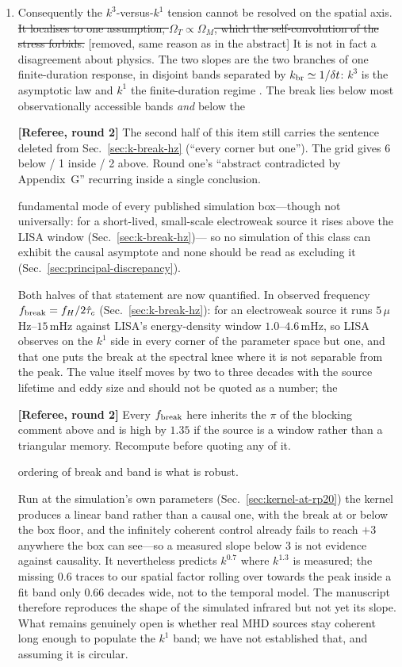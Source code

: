\documentclass[10pt,prd,aps,nobibnotes,superscriptaddress,preprintnumbers,notitlepage]{revtex4-1}
\newcommand{\rev}[1]{\par\noindent\begin{tcolorbox}[colback=blue!4,colframe=blue!55,
    boxrule=0.5pt,left=3pt,right=3pt,top=2pt,bottom=2pt,breakable]
    \footnotesize\textcolor{blue!65!black}{\textbf{[Referee, round 2]} #1}\end{tcolorbox}\par}
\newcommand{\revX}[1]{\par\noindent\begin{tcolorbox}[colback=red!5,colframe=red!70!black,
    boxrule=1pt,left=3pt,right=3pt,top=2pt,bottom=2pt,breakable]
    \footnotesize\textcolor{red!70!black}{\textbf{[Referee, round 2 --- BLOCKING]} #1}\end{tcolorbox}\par}
\newcommand{\rev}[1]{}\newcommand{\revX}[1]{}
\newcommand{\add}[1]{{\color{red}#1}}
\newcommand{\del}[1]{{\color{red}\sout{#1}}}
\newcommand{\why}[1]{{\color{red}\footnotesize\textsf{[#1]}}}
\newcommand{\add}[1]{#1}
\newcommand{\del}[1]{}
\newcommand{\why}[1]{}
\begin{document}
\begin{enumerate}
  \item Consequently the $k^{3}$-versus-$k^{1}$ tension cannot be resolved on the
  spatial axis.
  \del{It localises to one assumption, $\Omega_{T}\propto\Omega_{M}$, which the
  self-convolution of the stress forbids.}
  \why{removed, same reason as in the abstract}
  \add{It is not in fact a disagreement about physics.} The two slopes
  are the two branches of one finite-duration response, in disjoint bands separated
  by $k_{\rm br}\simeq1/\delta t$: $k^{3}$ is the asymptotic law and $k^{1}$ the
  finite-duration regime \cite{RoperPol:2022iel,RoperPol:2023dzg}. The break lies
  below \add{most} observationally accessible band\add{s} \emph{and} below the
\rev{The second half of this item still carries the sentence deleted from
Sec.~\ref{sec:k-break-hz} (``every corner but one''). The grid gives 6 below / 1 inside /
2 above. Round one's ``abstract contradicted by Appendix~G'' recurring inside a single
conclusion.}
  fundamental mode of every published simulation box\add{---though not universally:
  for a short-lived, small-scale electroweak source it rises above the LISA window
  (Sec.~\ref{sec:k-break-hz})}--- so no simulation of this class can exhibit the
  causal asymptote and none should be read as excluding it
  (Sec.~\ref{sec:principal-discrepancy}).
  \add{Both halves of that statement are now quantified. In observed frequency
  $f_{\rm break}=f_H/2\hat\tau_c$ (Sec.~\ref{sec:k-break-hz}): for an electroweak
  source it runs $5\,\mu$Hz--$15\,$mHz against LISA's energy-density window
  $1.0$--$4.6\,$mHz, so LISA observes on the $k^{1}$ side in every corner of the
  parameter space but one, and that one puts the break at the spectral knee where it
  is not separable from the peak. The value itself moves by two to three decades with
  the source lifetime and eddy size and should not be quoted as a number; the
\rev{Every $f_{\rm break}$ here inherits the $\pi$ of the blocking comment above and
is high by $1.35$ if the source is a window rather than a triangular memory. Recompute
before quoting any of it.}
  ordering of break and band is what is robust.}
  \add{Run at the simulation's own parameters
  (Sec.~\ref{sec:kernel-at-rp20}) the kernel produces a linear band rather than a causal
  one, with the break at or below the box floor, and the infinitely coherent control
  already fails to reach $+3$ anywhere the box can see---so a measured slope below $3$ is
  not evidence against causality. It nevertheless predicts $k^{0.7}$ where $k^{1.3}$ is
  measured; the missing $0.6$ traces to our spatial factor rolling over towards the peak
  inside a fit band only $0.66$ decades wide, not to the temporal model. The manuscript
  therefore reproduces the shape of the simulated infrared but not yet its slope.} What remains genuinely open is whether
  real MHD sources stay coherent long enough to populate the $k^{1}$ band; we have
  not established that, and assuming it is circular.


\end{enumerate}
\end{document}

